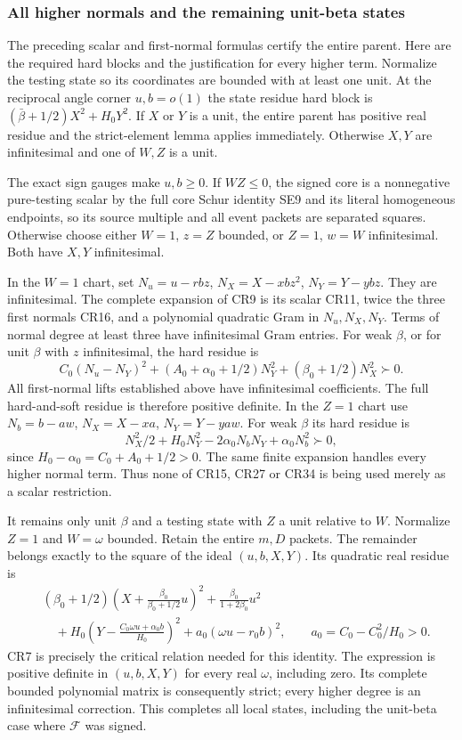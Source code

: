 \subsubsection*{All higher normals and the remaining unit-beta states}

The preceding scalar and first-normal formulas certify the entire
parent. Here are the required hard blocks and the justification for
every higher term. Normalize the testing state so its coordinates
are bounded with at least one unit. At the reciprocal angle corner
$u,b=o(1)$ the state residue hard block is
$(\bar\beta+1/2)X^2+H_0Y^2$. If $X$ or $Y$ is a unit, the
entire parent has positive real residue and the strict-element lemma
applies immediately. Otherwise $X,Y$ are infinitesimal and one of
$W,Z$ is a unit.

The exact sign gauges make $u,b\geq0$. If $WZ\leq0$, the signed
core is a nonnegative pure-testing scalar by the full core Schur
identity SE9 and its literal homogeneous endpoints, so its source
multiple and all event packets are separated squares. Otherwise
choose either $W=1$, $z=Z$ bounded, or $Z=1$, $w=W$
infinitesimal. Both have $X,Y$ infinitesimal.

In the $W=1$ chart, set
$N_u=u-rbz$, $N_X=X-xbz^2$, $N_Y=Y-ybz$.
They are infinitesimal. The complete expansion of CR9 is its scalar
CR11, twice the three first normals CR16, and a polynomial quadratic
Gram in $N_u,N_X,N_Y$. Terms of normal degree at least three
have infinitesimal Gram entries. For weak $\beta$, or for unit
$\beta$ with $z$ infinitesimal, the hard residue is
\[
 C_0(N_u-N_Y)^2+(A_0+\alpha_0+1/2)N_Y^2
                         +(\beta_0+1/2)N_X^2\succ0.
 \tag{CR37}
\]
All first-normal lifts established above have infinitesimal
coefficients. The full hard-and-soft residue is therefore positive
definite. In the $Z=1$ chart use
$N_b=b-aw$, $N_X=X-xa$, $N_Y=Y-yaw$.
For weak $\beta$ its hard residue is
\[
 N_X^2/2+H_0N_Y^2-2\alpha_0N_bN_Y+\alpha_0N_b^2\succ0,
 \tag{CR38}
\]
since $H_0-\alpha_0=C_0+A_0+1/2>0$.
The same finite expansion handles every higher normal term. Thus
none of CR15, CR27 or CR34 is being used merely as a scalar
restriction.

It remains only unit $\beta$ and a testing state with $Z$ a unit
relative to $W$. Normalize $Z=1$ and $W=\omega$ bounded. Retain
the entire $m,D$ packets. The remainder belongs exactly to the
square of the ideal $(u,b,X,Y)$. Its quadratic real residue is
\[
\begin{aligned}
 &(\beta_0+1/2)\left(X+\frac{\beta_0}{\beta_0+1/2}u\right)^2
      +\frac{\beta_0}{1+2\beta_0}u^2\\
 &\quad+H_0\left(Y-\frac{C_0\omega u+\alpha_0 b}{H_0}\right)^2
      +a_0(\omega u-r_0b)^2,
 \qquad a_0=C_0-C_0^2/H_0>0.
\end{aligned}\tag{CR39}
\]
CR7 is precisely the critical relation needed for this identity.
The expression is positive definite in $(u,b,X,Y)$ for every
real $\omega$, including zero. Its complete bounded polynomial
matrix is consequently strict; every higher degree is an
infinitesimal correction. This completes all local states, including
the unit-beta case where $\mathcal F$ was signed.

